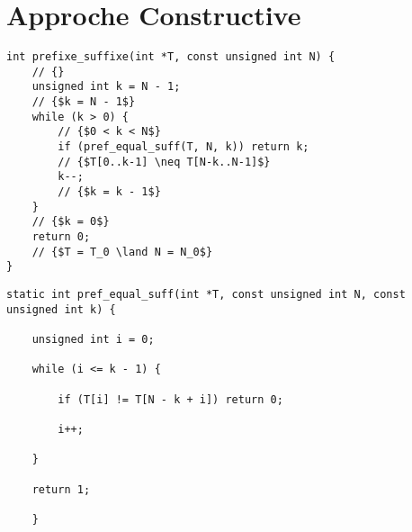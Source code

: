\section{Approche Constructive}

\begin{lstlisting}[caption={SP1}]
int prefixe_suffixe(int *T, const unsigned int N) {
    // {}
    unsigned int k = N - 1;
    // {$k = N - 1$}
    while (k > 0) {
        // {$0 < k < N$}
        if (pref_equal_suff(T, N, k)) return k;
        // {$T[0..k-1] \neq T[N-k..N-1]$}
        k--;
        // {$k = k - 1$}
    }
    // {$k = 0$}
    return 0;
    // {$T = T_0 \land N = N_0$}
}
\end{lstlisting}




\begin{lstlisting}[caption={SP2}]
static int pref_equal_suff(int *T, const unsigned int N, const unsigned int k) {

    unsigned int i = 0;

    while (i <= k - 1) {

        if (T[i] != T[N - k + i]) return 0;

        i++;

    }

    return 1;

    }
\end{lstlisting}


